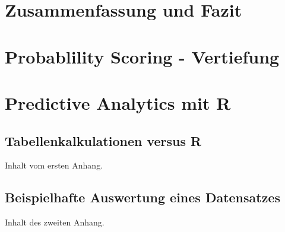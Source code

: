 \documentclass[12pt,a4paper,listof=totoc,oneside]{scrreprt}
\begin{document}
\chapter{Zusammenfassung und Fazit}

\appendix
\chapter{Probablility Scoring - Vertiefung}

\chapter{Predictive Analytics mit R}

\section{Tabellenkalkulationen versus R}

Inhalt vom ersten Anhang.

\section{Beispielhafte Auswertung eines Datensatzes}

Inhalt des zweiten Anhang.

{}


\listoffigures
\listoftables
\printglossary[title=Glossar]
\printglossary[type=\acronymtype, title=Akronyme]
\end{document}
